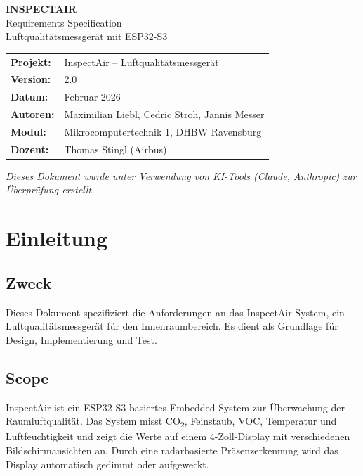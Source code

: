 \documentclass[a4paper,11pt]{article}
\begin{document}
\begin{center}
{\LARGE\textbf{INSPECTAIR}}\\[0.3cm]
{\Large Requirements Specification}\\[0.3cm]
{\large Luftqualitätsmessgerät mit ESP32-S3}\\[0.5cm]
\begin{tabular}{ll}
\textbf{Projekt:} & InspectAir -- Luftqualitätsmessgerät \\
\textbf{Version:} & 2.0 \\
\textbf{Datum:} & Februar 2026 \\
\textbf{Autoren:} & Maximilian Liebl, Cedric Stroh, Jannis Messer \\
\textbf{Modul:} & Mikrocomputertechnik 1, DHBW Ravensburg \\
\textbf{Dozent:} & Thomas Stingl (Airbus) \\
\end{tabular}
\end{center}

\vspace{0.5cm}
\noindent\textit{Dieses Dokument wurde unter Verwendung von KI-Tools (Claude, Anthropic) zur Überprüfung erstellt.}
\vspace{0.3cm}

\tableofcontents
\newpage

\section{Einleitung}

\subsection{Zweck}
Dieses Dokument spezifiziert die Anforderungen an das InspectAir-System, ein Luftqualitätsmessgerät für den Innenraumbereich. Es dient als Grundlage für Design, Implementierung und Test.

\subsection{Scope}
InspectAir ist ein ESP32-S3-basiertes Embedded System zur Überwachung der Raumluftqualität. Das System misst CO\textsubscript{2}, Feinstaub, VOC, Temperatur und Luftfeuchtigkeit und zeigt die Werte auf einem 4-Zoll-Display mit verschiedenen Bildschirmansichten an. Durch eine radarbasierte Präsenzerkennung wird das Display automatisch gedimmt oder aufgeweckt.
\end{document}
